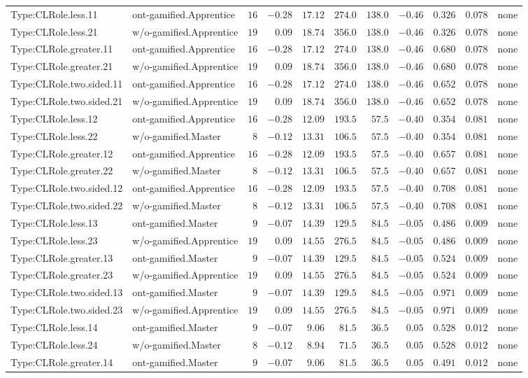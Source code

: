\documentclass[6pt,a4paper]{article}
\begin{document}
{\begin{longtable}{llrrrrrrrrl}
Type:CLRole.less.11&ont-gamified.Apprentice&$16$&$-0.28$&$17.12$&$274.0$&$138.0$&$-0.46$&$0.326$&$0.078$&none\tabularnewline
Type:CLRole.less.21&w/o-gamified.Apprentice&$19$&$ 0.09$&$18.74$&$356.0$&$138.0$&$-0.46$&$0.326$&$0.078$&none\tabularnewline
Type:CLRole.greater.11&ont-gamified.Apprentice&$16$&$-0.28$&$17.12$&$274.0$&$138.0$&$-0.46$&$0.680$&$0.078$&none\tabularnewline
Type:CLRole.greater.21&w/o-gamified.Apprentice&$19$&$ 0.09$&$18.74$&$356.0$&$138.0$&$-0.46$&$0.680$&$0.078$&none\tabularnewline
Type:CLRole.two.sided.11&ont-gamified.Apprentice&$16$&$-0.28$&$17.12$&$274.0$&$138.0$&$-0.46$&$0.652$&$0.078$&none\tabularnewline
Type:CLRole.two.sided.21&w/o-gamified.Apprentice&$19$&$ 0.09$&$18.74$&$356.0$&$138.0$&$-0.46$&$0.652$&$0.078$&none\tabularnewline
Type:CLRole.less.12&ont-gamified.Apprentice&$16$&$-0.28$&$12.09$&$193.5$&$ 57.5$&$-0.40$&$0.354$&$0.081$&none\tabularnewline
Type:CLRole.less.22&w/o-gamified.Master&$ 8$&$-0.12$&$13.31$&$106.5$&$ 57.5$&$-0.40$&$0.354$&$0.081$&none\tabularnewline
Type:CLRole.greater.12&ont-gamified.Apprentice&$16$&$-0.28$&$12.09$&$193.5$&$ 57.5$&$-0.40$&$0.657$&$0.081$&none\tabularnewline
Type:CLRole.greater.22&w/o-gamified.Master&$ 8$&$-0.12$&$13.31$&$106.5$&$ 57.5$&$-0.40$&$0.657$&$0.081$&none\tabularnewline
Type:CLRole.two.sided.12&ont-gamified.Apprentice&$16$&$-0.28$&$12.09$&$193.5$&$ 57.5$&$-0.40$&$0.708$&$0.081$&none\tabularnewline
Type:CLRole.two.sided.22&w/o-gamified.Master&$ 8$&$-0.12$&$13.31$&$106.5$&$ 57.5$&$-0.40$&$0.708$&$0.081$&none\tabularnewline
Type:CLRole.less.13&ont-gamified.Master&$ 9$&$-0.07$&$14.39$&$129.5$&$ 84.5$&$-0.05$&$0.486$&$0.009$&none\tabularnewline
Type:CLRole.less.23&w/o-gamified.Apprentice&$19$&$ 0.09$&$14.55$&$276.5$&$ 84.5$&$-0.05$&$0.486$&$0.009$&none\tabularnewline
Type:CLRole.greater.13&ont-gamified.Master&$ 9$&$-0.07$&$14.39$&$129.5$&$ 84.5$&$-0.05$&$0.524$&$0.009$&none\tabularnewline
Type:CLRole.greater.23&w/o-gamified.Apprentice&$19$&$ 0.09$&$14.55$&$276.5$&$ 84.5$&$-0.05$&$0.524$&$0.009$&none\tabularnewline
Type:CLRole.two.sided.13&ont-gamified.Master&$ 9$&$-0.07$&$14.39$&$129.5$&$ 84.5$&$-0.05$&$0.971$&$0.009$&none\tabularnewline
Type:CLRole.two.sided.23&w/o-gamified.Apprentice&$19$&$ 0.09$&$14.55$&$276.5$&$ 84.5$&$-0.05$&$0.971$&$0.009$&none\tabularnewline
Type:CLRole.less.14&ont-gamified.Master&$ 9$&$-0.07$&$ 9.06$&$ 81.5$&$ 36.5$&$ 0.05$&$0.528$&$0.012$&none\tabularnewline
Type:CLRole.less.24&w/o-gamified.Master&$ 8$&$-0.12$&$ 8.94$&$ 71.5$&$ 36.5$&$ 0.05$&$0.528$&$0.012$&none\tabularnewline
Type:CLRole.greater.14&ont-gamified.Master&$ 9$&$-0.07$&$ 9.06$&$ 81.5$&$ 36.5$&$ 0.05$&$0.491$&$0.012$&none\tabularnewline

\end{longtable}}
\end{document}
